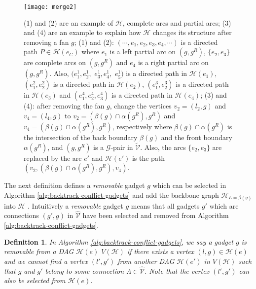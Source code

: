 \documentclass[11pt]{article}
\newcommand{\HH}{\mathcal{H}}
\newcommand{\GG}{\mathcal{G}}
\newcommand{\VV}{\mathcal{V}}
\newtheorem{definition}[figure]{Definition}
\begin{document}
\begin{figure}[t]
\centering
\texttt{[image: merge2]}
\caption{
(1) and (2) are an example of $\HH$, complete arcs and partial arcs;
(3) and (4) are an example to explain how $\HH$ changes its structure after removing
a fan $g$;
(1) and (2): $(\cdots, e_1, e_2, e_3, e_4, \cdots)$ is a directed path $P\in \HH(e_C)$
where $e_1$ is a left partial arc on $(g, g^R)$,
$\{e_2, e_3\}$ are complete arcs on $(g, g^R)$ and
$e_4$ is a right partial arc on $(g, g^R)$.
Also, $(e^1_1, e^1_2,$ $e^1_3, e^1_4,$ $e^1_5)$
is a directed path in $\HH(e_1)$,
$(e^2_1, e^2_2)$ is a directed path in $\HH(e_2)$,
$(e^3_1, e^3_2)$ is a directed path in $\HH(e_3)$ and
$(e^4_1, e^4_2, e^4_3)$ is a directed path in $\HH(e_4)$;
(3) and (4): after removing the fan $g$,
change the vertices $v_2=(l_2, g)$ and $v_4=(l_4, g)$ to
$v_2=(\beta(g)\cap \alpha(g^R), g^R)$ and $v_4=(\beta(g)\cap \alpha(g^R), g^R)$, respectively
where $\beta(g) \cap \alpha(g^R)$ is the intersection of the back boundary $\beta(g)$
and the front boundary $\alpha(g^R)$,
and $(g, g^R)$ is a $\GG$-pair in $\tilde{\VV}$.
Also, the arcs $\{e_2, e_3\}$ are replaced by the arc $e'$
and $\HH(e')$ is the path $(v_2, (\beta(g)\cap \alpha(g^R), g^R), v_4)$.
}
\label{fig:merge}
\end{figure}

The next definition
defines a \emph{removable} gadget $g$
which can be selected in Algorithm \ref{alg:backtrack-conflict-gadgets}
and add the backbone graph $\HH_{L=\beta(g)}$ into $\HH$ .
Intuitively a \emph{removable} gadget $g$ means that
all gadgets $g'$ which are connections $(g', g)$ in $\hat{\VV}$
have been selected and removed from Algorithm \ref{alg:backtrack-conflict-gadgets}.

\begin{definition}\label{def:removable-gadget}
In Algorithm \ref{alg:backtrack-conflict-gadgets},
we say a gadget $g$ is \emph{removable} from a DAG $\HH(e)$ $V(\HH)$
if there exists a vertex $(l, g) \in \HH(e)$ and
we cannot find a vertex $(l', g')$ from another DAG $\HH(e')$ in $V(\HH)$
such that
$g$ and $g'$ belong to some connection $\Lambda\in \hat{\VV}$.
Note that the vertex $(l', g')$ can also be selected from $\HH(e)$.
\end{definition}
\end{document}
